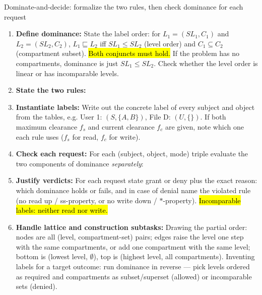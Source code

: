 \documentclass[12pt, a4paper]{article}
\newcommand{\imp}[1]{\hl{#1}}                       %
\begin{document}
\begin{schemebox}{Dominate-and-decide: formalize the two rules, then check dominance for each request}
\begin{enumerate}[label=\textbf{Step \arabic*:}, leftmargin=*]
    \item \textbf{Define dominance:} State the label order: for $L_1 = (SL_1, C_1)$ and $L_2 = (SL_2, C_2)$, $L_1 \sqsubseteq L_2$ iff $SL_1 \leq SL_2$ (level order) and $C_1 \subseteq C_2$ (compartment subset).
    \imp{Both conjuncts must hold.} If the problem has no compartments, dominance is just $SL_1 \leq SL_2$. Check whether the level order is linear or has incomparable levels.
    \item \textbf{State the two rules:} 
    \item \textbf{Instantiate labels:} Write out the concrete label of every subject and object from the tables, e.g. User 1: $(S, \{A, B\})$, File D: $(U, \{\})$. If both maximum clearance $f_s$ and current clearance $f_c$ are given, note which one each rule uses ($f_s$ for read, $f_c$ for write).
    \item \textbf{Check each request:} For each (subject, object, mode) triple evaluate the two components of dominance \emph{separately}:
    \item \textbf{Justify verdicts:} For each request state grant or deny plus the exact reason: which dominance holds or fails, and in case of denial name the violated rule (no read up / ss-property, or no write down / $*$-property). \imp{Incomparable labels: neither read nor write.}
    \item \textbf{Handle lattice and construction subtasks:} Drawing the partial order: nodes are all (level, compartment-set) pairs; edges raise the level one step with the same compartments, or add one compartment with the same level; bottom is (lowest level, $\emptyset$), top is (highest level, all compartments).
    Inventing labels for a target outcome: run dominance in reverse --- pick levels ordered as required and compartments as subset/superset (allowed) or incomparable sets (denied).
\end{enumerate}
\end{schemebox}
\end{document}
